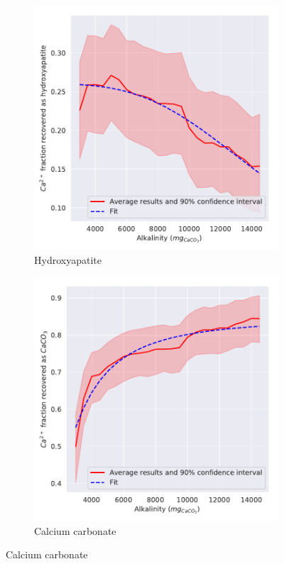 \begin{refsection}[referencesCh3]
\begin{figure}[h]
\begin{subfigure}[t]{0.25\textheight}
		\includegraphics[width=\textwidth]{gfx/AppendixB/x_plotHAPYield_Alk} 
		\caption{Hydroxyapatite}
		\label{fig:estimation_Alk_HAP}
	\end{subfigure} 
	\begin{subfigure}[t]{0.25\textheight}
		\includegraphics[width=\textwidth]{gfx/AppendixB/x_plotCaCO3Yield_Alk}
		\caption{Calcium carbonate}
		\label{fig:estimation_Alk_CaCO3}
	\end{subfigure}
	

\end{figure}
\end{refsection}
